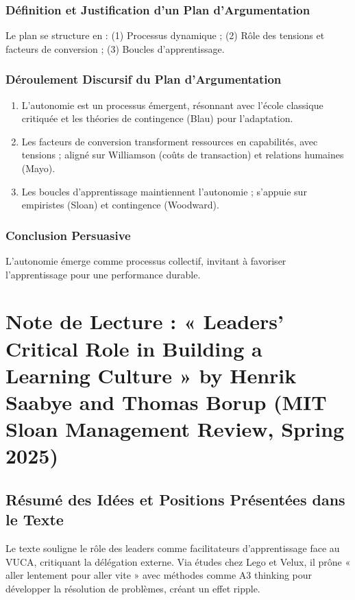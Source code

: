 \documentclass[11pt]{rapportECL}
\begin{document}
\subsubsection{Définition et Justification d’un Plan d’Argumentation}
Le plan se structure en : (1) Processus dynamique ; (2) Rôle des tensions et facteurs de conversion ; (3) Boucles d’apprentissage.

\subsubsection{Déroulement Discursif du Plan d’Argumentation}
\begin{enumerate}
\item L’autonomie est un processus émergent, résonnant avec l’école classique critiquée et les théories de contingence (Blau) pour l’adaptation.
\item Les facteurs de conversion transforment ressources en capabilités, avec tensions ; aligné sur Williamson (coûts de transaction) et relations humaines (Mayo).
\item Les boucles d’apprentissage maintiennent l’autonomie ; s’appuie sur empiristes (Sloan) et contingence (Woodward).
\end{enumerate}

\subsubsection{Conclusion Persuasive}
L’autonomie émerge comme processus collectif, invitant à favoriser l’apprentissage pour une performance durable.

\section{Note de Lecture : « Leaders’ Critical Role in Building a Learning Culture » by Henrik Saabye and Thomas Borup (MIT Sloan Management Review, Spring 2025)}

\subsection{Résumé des Idées et Positions Présentées dans le Texte}
Le texte souligne le rôle des leaders comme facilitateurs d’apprentissage face au VUCA, critiquant la délégation externe. Via études chez Lego et Velux, il prône « aller lentement pour aller vite » avec méthodes comme A3 thinking pour développer la résolution de problèmes, créant un effet ripple.
\end{document}
